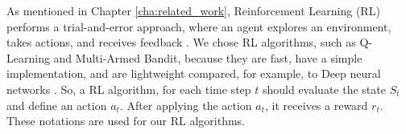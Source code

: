 As mentioned in Chapter \ref{cha:related_work}, Reinforcement Learning (RL) performs a trial-and-error approach, where an agent explores an environment, takes actions, and receives feedback \cite{kaelbling1996reinforcement}. We chose RL algorithms, such as Q-Learning and Multi-Armed Bandit, because they are fast, have a simple implementation, and are lightweight compared, for example, to Deep neural networks \cite{yang2017method}. So, a RL algorithm, for each time step $t$ should evaluate the state $S_t$ and define an action $a_t$. After applying the action $a_t$, it receives a reward $r_t$. These notations are used for our RL algorithms.
